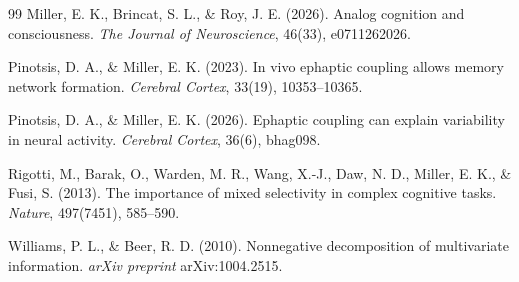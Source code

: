 \documentclass[11pt]{book}
\begin{document}
\begin{thebibliography}{99}
Miller, E. K., Brincat, S. L., \& Roy, J. E. (2026). Analog cognition and consciousness. \textit{The Journal of Neuroscience}, 46(33), e0711262026.

Pinotsis, D. A., \& Miller, E. K. (2023). In vivo ephaptic coupling allows memory network formation. \textit{Cerebral Cortex}, 33(19), 10353--10365.

Pinotsis, D. A., \& Miller, E. K. (2026). Ephaptic coupling can explain variability in neural activity. \textit{Cerebral Cortex}, 36(6), bhag098.

Rigotti, M., Barak, O., Warden, M. R., Wang, X.-J., Daw, N. D., Miller, E. K., \& Fusi, S. (2013). The importance of mixed selectivity in complex cognitive tasks. \textit{Nature}, 497(7451), 585--590.

Williams, P. L., \& Beer, R. D. (2010). Nonnegative decomposition of multivariate information. \textit{arXiv preprint} arXiv:1004.2515.

\end{thebibliography}
\end{document}
